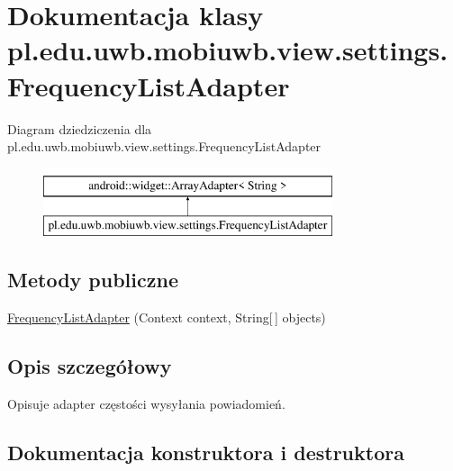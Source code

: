 \hypertarget{classpl_1_1edu_1_1uwb_1_1mobiuwb_1_1view_1_1settings_1_1_frequency_list_adapter}{}\section{Dokumentacja klasy pl.\+edu.\+uwb.\+mobiuwb.\+view.\+settings.\+Frequency\+List\+Adapter}
\label{classpl_1_1edu_1_1uwb_1_1mobiuwb_1_1view_1_1settings_1_1_frequency_list_adapter}
Diagram dziedziczenia dla pl.\+edu.\+uwb.\+mobiuwb.\+view.\+settings.\+Frequency\+List\+Adapter\begin{figure}[H]
\begin{center}
\leavevmode
\includegraphics[height=2.000000cm]{classpl_1_1edu_1_1uwb_1_1mobiuwb_1_1view_1_1settings_1_1_frequency_list_adapter}
\end{center}
\end{figure}
\subsection*{Metody publiczne}
\begin{DoxyCompactItemize}
\item 
\hyperlink{classpl_1_1edu_1_1uwb_1_1mobiuwb_1_1view_1_1settings_1_1_frequency_list_adapter_ac0190511cd039ce42ea230af7db5bf50}{Frequency\+List\+Adapter} (Context context, String\mbox{[}$\,$\mbox{]} objects)
\end{DoxyCompactItemize}


\subsection{Opis szczegółowy}
Opisuje adapter częstości wysyłania powiadomień. 

\subsection{Dokumentacja konstruktora i destruktora}
\hypertarget{classpl_1_1edu_1_1uwb_1_1mobiuwb_1_1view_1_1settings_1_1_frequency_list_adapter_ac0190511cd039ce42ea230af7db5bf50}{}
